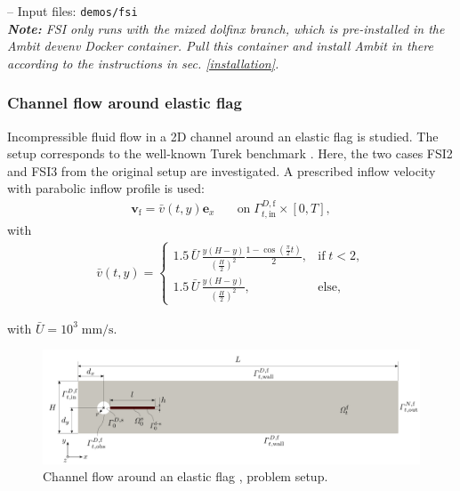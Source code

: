 \documentclass[a4paper,12pt]{report}
\newcommand{\fF}{\text{f}}
\newcommand{\bs}[1]{\boldsymbol{#1}}
\newcommand{\Gm}{\mathit{\Gamma}}
\newcommand{\vf}{\bs{v}_{\fF}} %
\begin{document}
-- Input files: \verb"demos/fsi"\\

\textit{\textbf{Note:} FSI only runs with the mixed dolfinx branch, which is pre-installed in the Ambit devenv Docker container. Pull this container and install Ambit in there according to the instructions in sec. \ref{installation}.}

\subsubsection*{Channel flow around elastic flag}

Incompressible fluid flow in a 2D channel around an elastic flag is studied. The setup corresponds to the well-known Turek benchmark \cite{turek2006}. Here, the two cases FSI2 and FSI3 from the original setup are investigated. A prescribed inflow velocity with parabolic inflow profile is used:\\
\begin{equation}
\begin{aligned}
    \vf = \bar{v}(t,y) \bs{e}_{x}
    \quad &  
    \text{on}\; \Gm_{t,\mathrm{in}}^{D,\fF} \times [0,T],
    \label{eq:flag_dbc_in}
\end{aligned}
\end{equation}
with 
\begin{equation}
\begin{aligned}
    \bar{v}(t,y) = \begin{cases} 1.5 \,\bar{U}\, \frac{y(H-y)}{\left(\frac{H}{2}\right)^2} \frac{1-\cos\left(\frac{\pi}{2}t\right)}{2}, & \text{if} \; t < 2, \\ 1.5 \,\bar{U}\, \frac{y(H-y)}{\left(\frac{H}{2}\right)^2}, & \text{else}, \end{cases}
    \label{eq:flag_dbcs_func}
\end{aligned}
\end{equation}

with $\bar{U}=10^{3}\;\mathrm{mm}/\mathrm{s}$.\\

\begin{figure}
\centering
\includegraphics[width=1.0\textwidth]{fig/channel_flag_setup.png}
\caption{Channel flow around an elastic flag \cite{turek2006}, problem setup.}
\label{fig:channel_flag_setup}
\end{figure}
\end{document}
